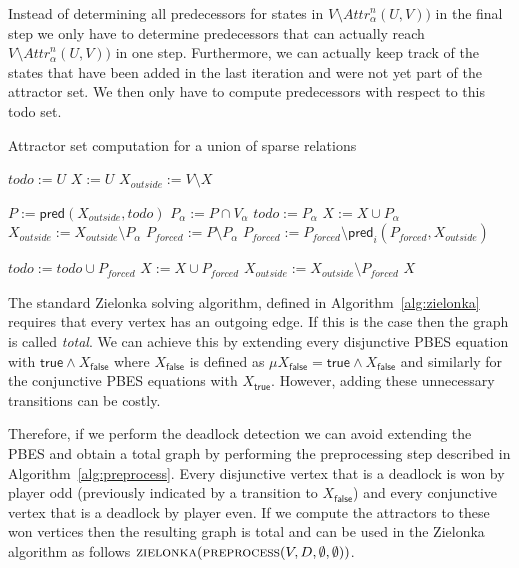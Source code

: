 \documentclass{article}
\newcommand{\var}[1]{\ensuremath{\textit{#1}}}
\newcommand{\attrsym}{\ensuremath{\textit{Attr}}}
\newcommand{\attr}[3][]{\ensuremath{\attrsym^{#1}_{#2}(#3)}}
\begin{document}
Instead of determining all predecessors for states in $V \setminus \attr[n]{\alpha}{U,V})$ in the final step we only have to determine predecessors that can actually reach $V \setminus \attr[n]{\alpha}{U,V})$ in one step.
Furthermore, we can actually keep track of the states that have been added in the last iteration and were not yet part of the attractor set.
We then only have to compute predecessors with respect to this todo set.

\begin{algorithm}[H]
\caption{Attractor set computation for a union of sparse relations}
\label{alg:attractor_set}
\begin{algorithmic}[1]
\State $\var{todo} := U$
\State $\var{X} := U$
\State $\var{X}_\textit{outside} := V \setminus X$

\While {$\var{todo} \neq \emptyset$}
  \State $\var{P} := \textsf{pred}(\var{X}_\textit{outside}, \var{todo})$
  \State $\var{P}_\alpha := \var{P} \cap \var{V}_\alpha$
  \State $\var{todo} := \var{P}_\alpha$
  \State $\var{X} := \var{X} \cup \var{P}_\alpha$
  \State $\var{X}_\textit{outside} := \var{X}_\textit{outside} \setminus \var{P}_\alpha$
  \State $\var{P}_\textit{forced} := \var{P} \setminus \var{P}_\alpha$
    \State $\var{P}_\textit{forced} := \var{P}_\textit{forced} \setminus \textsf{pred}_i(\var{P}_\textit{forced}, \var{X}_\textit{outside})$
  
  \EndFor
  \State $\var{todo} := \var{todo} \cup \var{P}_\textit{forced}$
  \State $\var{X} := \var{X} \cup \var{P}_\textit{forced}$
  \State $\var{X}_\textit{outside} := \var{X}_\textit{outside} \setminus \var{P}_\textit{forced}$
\EndWhile
\State \Return \var{X}
\EndFunction
\end{algorithmic}
\end{algorithm}

The standard Zielonka solving algorithm, defined in Algorithm~\ref{alg:zielonka} requires that every vertex has an outgoing edge.
If this is the case then the graph is called \emph{total}.
We can achieve this by extending every disjunctive PBES equation with $\textsf{true} \land X_\textsf{false}$ where $X_\textsf{false}$ is defined as $\mu X_\textsf{false} = \textsf{true} \land X_\textsf{false}$ and similarly for the conjunctive PBES equations with $X_\textsf{true}$.
However, adding these unnecessary transitions can be costly.

Therefore, if we perform the deadlock detection we can avoid extending the PBES and obtain a total graph by performing the preprocessing step described in Algorithm~\ref{alg:preprocess}.
Every disjunctive vertex that is a deadlock is won by player odd (previously indicated by a transition to $X_\textsf{false}$) and every conjunctive vertex that is a deadlock by player even.
If we compute the attractors to these won vertices then the resulting graph is total and can be used in the Zielonka algorithm as follows $\textsc{zielonka}(\textsc{preprocess}(V, D, \emptyset, \emptyset))$.
\end{document}
